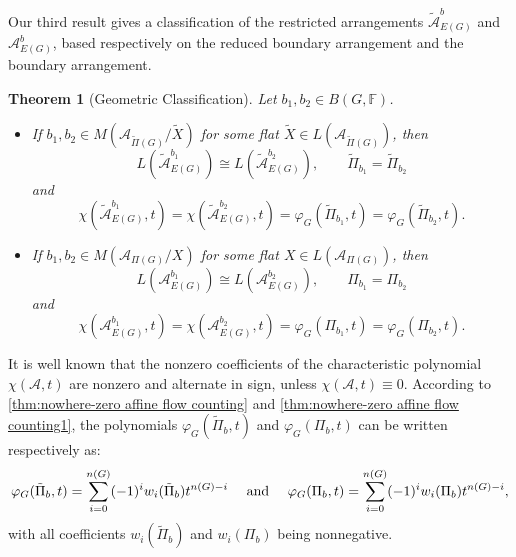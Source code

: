 \documentclass[12pt]{article}%
\renewcommand*{\bm}[1]{#1}%
\numberwithin{equation}{section}
\def\And{\mbox{\rm ~and~}}
\newtheorem{theorem}{Theorem}[section]
\begin{document}
Our third result gives a classification of the restricted arrangements $\tilde{\mathcal{A}}_{E(G)}^{\bm b}$ and $\mathcal{A}_{E(G)}^{\bm b}$, based respectively on the reduced boundary arrangement and the boundary arrangement.
\begin{theorem}[Geometric Classification]\label{Classification}Let $\bm b_1,\bm b_2\in B(G,\mathbb{F})$.
\begin{itemize}
\item[{\rm(a)}] If $\bm b_1,\bm b_2\in M(\mathcal{A}_{\tilde{\Pi}(G)}/\tilde{X})$ for some flat $\tilde{X}\in L(\mathcal{A}_{\tilde{\Pi}(G)})$, then
\[
L(\tilde{\mathcal{A}}_{E(G)}^{\bm b_1})\cong L(\tilde{\mathcal{A}}_{E(G)}^{\bm b_2}),\quad\quad\tilde{\Pi}_{\bm b_1}=\tilde{\Pi}_{\bm b_2}
\]
and 
\[
\chi(\tilde{\mathcal{A}}_{E(G)}^{\bm b_1},t)=\chi(\tilde{\mathcal{A}}_{E(G)}^{\bm b_2},t)=\varphi_G(\tilde{\Pi}_{\bm b_1},t)=\varphi_G(\tilde{\Pi}_{\bm b_2},t).
\]
\item[{\rm(b)}]If $\bm b_1,\bm b_2\in M(\mathcal{A}_{\Pi(G)}/X)$ for some flat $X\in L(\mathcal{A}_{\Pi(G)})$, then
\[
L(\mathcal{A}_{E(G)}^{\bm b_1})\cong L(\mathcal{A}_{E(G)}^{\bm b_2}),\quad\quad\Pi_{\bm b_1}=\Pi_{\bm b_2}
\]
and 
\[
\chi(\mathcal{A}_{E(G)}^{\bm b_1},t)=\chi(\mathcal{A}_{E(G)}^{\bm b_2},t)=\varphi_G(\Pi_{\bm b_1},t)=\varphi_G(\Pi_{\bm b_2},t).
\]
\end{itemize}
\end{theorem}

It is well known that the nonzero coefficients of the characteristic polynomial $\chi(\mathcal{A},t)$ are nonzero and alternate in sign, unless $\chi(\mathcal{A},t)\equiv0$. According to \autoref{thm:nowhere-zero affine flow counting} and \autoref{thm:nowhere-zero affine flow counting1}, the polynomials $\varphi_G(\tilde{\Pi}_{\bm b},t)$ and  $\varphi_G(\Pi_{\bm b},t)$ can be written respectively as:
\[
\varphi_G(\tilde{\Pi}_{\bm b},t)=\sum_{i=0}^{n(G)}(-1)^iw_i(\tilde{\Pi}_{\bm b})t^{n(G)-i}\quad\And\quad \varphi_G(\Pi_{\bm b},t)=\sum_{i=0}^{n(G)}(-1)^iw_i(\Pi_{\bm b})t^{n(G)-i},
\]
with all coefficients $w_i(\tilde{\Pi}_{\bm b})$ and $w_i(\Pi_{\bm b})$ being nonnegative.
\end{document}
